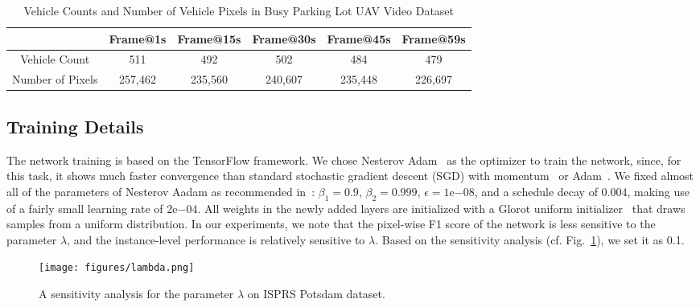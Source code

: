 \documentclass[journal]{IEEEtran}
\newcommand{\RR}[2]{\textcolor[rgb]{0,0,0}
{#2}}
\begin{document}
\begin{table*}[t]
\caption{\label{tab:parkinglot} Vehicle Counts and Number of Vehicle Pixels in Busy Parking Lot UAV Video Dataset}
\centering
\begin{tabular}{cccccc}
\toprule
 & \textbf{Frame@1s} & \textbf{Frame@15s} & \textbf{Frame@30s} & \textbf{Frame@45s} & \textbf{Frame@59s} \\
\hline
Vehicle Count & 511 & 492 & 502 & 484 & 479 \\
Number of Pixels & 257,462 & 235,560 & 240,607 & 235,448 & 226,697 \\
\bottomrule
\end{tabular}
\end{table*}

\subsection{Training Details}
The network training is based on the TensorFlow framework. We chose Nesterov Adam~\cite{nadam2,nadam1} as the optimizer to train the network, since, for this task, it shows much faster convergence than standard stochastic gradient descent (SGD) with momentum~\cite{sgd} or Adam~\cite{adam}. We fixed almost all of the parameters of Nesterov Aadam as recommended in~\cite{nadam2}: $\beta_1=0.9$, $\beta_2=0.999$, $\epsilon=1\mathrm{e}{-08}$, and a schedule decay of 0.004, making use of a fairly small learning rate of $2\mathrm{e}{-04}$. All weights in the newly added layers are initialized with a Glorot uniform initializer~\cite{Glorot_normal} that draws samples from a uniform distribution. \RR{}{In our experiments, we note that the pixel-wise F1 score of the network is less sensitive to the parameter $\lambda$, and the instance-level performance is relatively sensitive to $\lambda$. Based on the sensitivity analysis (cf. Fig.~\ref{fig:lambda}), we set it as 0.1.}

\begin{figure}[ht]
\centering
\texttt{[image: figures/lambda.png]}
\renewcommand{\figurename}{Fig}
\caption{\label{fig:lambda} \RR{}{A sensitivity analysis for the parameter $\lambda$ on ISPRS Potsdam dataset.}}
\end{figure}
\end{document}
